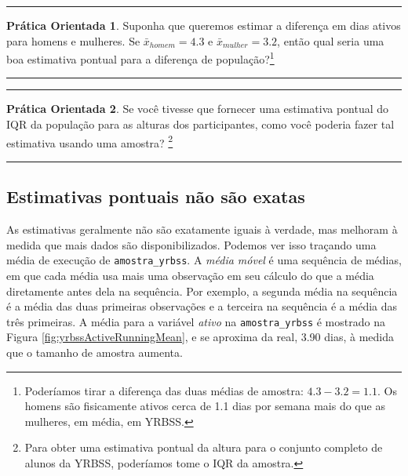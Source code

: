 \documentclass[
]{book}
\theoremstyle{definition}
\theoremstyle{definition}
\theoremstyle{definition}
\newtheorem{exercise}{Prática Orientada}[chapter]
\theoremstyle{definition}
\theoremstyle{remark}
\begin{document}
\begin{center}\rule{0.5\linewidth}{0.5pt}\end{center}

\begin{exercise}
\protect\hypertarget{exr:unnamed-chunk-149}{}{\label{exr:unnamed-chunk-149} }Suponha que queremos estimar a diferença em dias ativos para homens e mulheres. Se \(\bar{x}_{homem} = 4.3\) e \(\bar{x}_{mulher} = 3.2\), então qual seria uma boa estimativa pontual para a diferença de população?\footnote{Poderíamos tirar a diferença das duas médias de amostra: \(4.3 - 3.2 = 1.1\). Os homens são fisicamente ativos cerca de 1.1 dias por semana mais do que as mulheres, em média, em YRBSS.}
\end{exercise}

\begin{center}\rule{0.5\linewidth}{0.5pt}\end{center}

\begin{center}\rule{0.5\linewidth}{0.5pt}\end{center}

\begin{exercise}
\protect\hypertarget{exr:unnamed-chunk-150}{}{\label{exr:unnamed-chunk-150} }Se você tivesse que fornecer uma estimativa pontual do IQR da população para as alturas dos participantes, como você poderia fazer tal estimativa usando uma amostra? \footnote{Para obter uma estimativa pontual da altura para o conjunto completo de alunos da YRBSS, poderíamos tome o IQR da amostra.}
\end{exercise}

\begin{center}\rule{0.5\linewidth}{0.5pt}\end{center}

\hypertarget{pointEstimatesNotExact}{%
\subsection{Estimativas pontuais não são exatas}\label{pointEstimatesNotExact}}

As estimativas geralmente não são exatamente iguais à verdade, mas melhoram à medida que mais dados são disponibilizados. Podemos ver isso traçando uma média de execução de \texttt{amostra\_yrbss}. A \emph{média móvel} é uma sequência de médias, em que cada média usa mais uma observação em seu cálculo do que a média diretamente antes dela na sequência. Por exemplo, a segunda média na sequência é a média das duas primeiras observações e a terceira na sequência é a média das três primeiras. A média para a variável \emph{ativo} na \texttt{amostra\_yrbss} é mostrado na Figura \ref{fig:yrbssActiveRunningMean}, e se aproxima da real, 3.90 dias, à medida que o tamanho de amostra aumenta.
\end{document}

